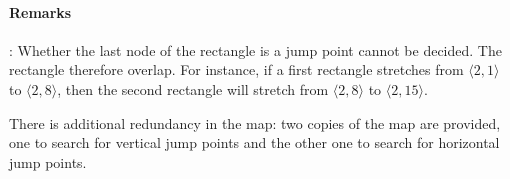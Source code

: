 \paragraph{Remarks}: 
Whether the last node of the rectangle is a jump point 
cannot be decided.  
The rectangle therefore overlap.  
For instance, if a first rectangle stretches 
from $\langle 2,1\rangle$ to $\langle 2,8\rangle$, 
then the second rectangle will stretch 
from $\langle 2,8\rangle$ to $\langle 2,15\rangle$.  

There is additional redundancy in the map: 
two copies of the map are provided, 
one to search for vertical jump points 
and the other one to search for horizontal jump points.  

